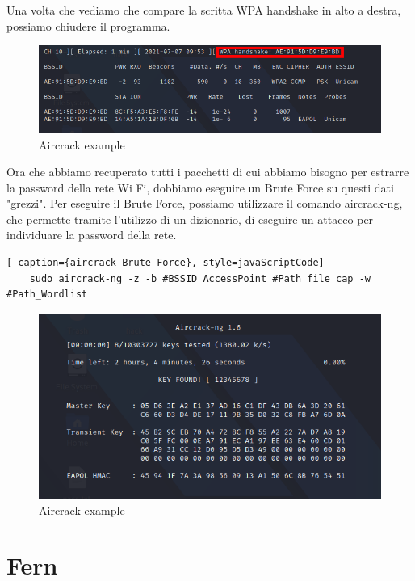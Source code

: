 Una volta che vediamo che compare la scritta WPA handshake in alto a destra, possiamo chiudere il programma.

\begin{figure}[ht]
    \centering
    \includegraphics[width=\linewidth]{Immagini/6/aircrack_5.png}
    \caption{Aircrack example}
    \label{fig:Aircrack example}
\end{figure}

Ora che abbiamo recuperato tutti i pacchetti di cui abbiamo bisogno per estrarre la password della rete Wi Fi, dobbiamo eseguire un Brute Force su questi dati "grezzi". Per eseguire il Brute Force, possiamo utilizzare il comando aircrack-ng, che permette tramite l'utilizzo di un dizionario, di eseguire un attacco per individuare la password della rete.

\begin{lstlisting}[ caption={aircrack Brute Force}, style=javaScriptCode]
    sudo aircrack-ng -z -b #BSSID_AccessPoint #Path_file_cap -w #Path_Wordlist
\end{lstlisting}

\begin{figure}[ht]
    \centering
    \includegraphics[width=\linewidth]{Immagini/6/ircrack_6.png}
    \caption{Aircrack example}
    \label{fig:Aircrack example}
\end{figure}

\newpage

\section{Fern}

